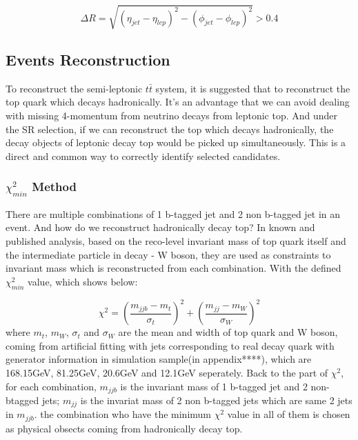 		\begin{equation}
		\Delta R = \sqrt{ (\eta_{jet} - \eta_{lep})^2 - (\phi_{jet} - \phi_{lep})^2 } > 0.4
		\end{equation}



	\subsection{Events Reconstruction}
	\label{ssec:EvtReco}

		To reconstruct the semi-leptonic $t\bar{t}$ system, it is suggested that to reconstruct the top quark which decays hadronically. It's an advantage that we can avoid dealing with missing 4-momentum from neutrino decays from leptonic top. And under the SR selection, if we can reconstruct the top which decays hadronically, the decay objects of leptonic decay top would be picked up simultaneously. This is a direct and common way to correctly identify selected candidates.

		\subsubsection{$\chi^2_{min}$ Method}
		\label{sssec:minchi2_intro} 

			There are multiple combinations of 1 b-tagged jet and 2 non b-tagged jet in an event. And how do we reconstruct hadronically decay top? In known and published analysis, based on the reco-level invariant mass of top quark itself and the intermediate particle in decay - W boson, they are used as constraints to invariant mass which is reconstructed from each combination. With the defined $\chi^2_{min}$ value, which shows below:

			\begin{equation}
			\chi^2 = (\frac{m_{jjb}-m_{t}}{\sigma_{t}})^2 + (\frac{m_{jj}-m_{W}}{\sigma_{W}})^2
			\label{eq:chi2}
			\end{equation}
			where $m_{t}$, $m_{W}$, $\sigma_{t}$ and $\sigma_{W}$ are the mean and width of top quark and W boson, coming from artificial fitting with jets corresponding to real decay quark with generator information in simulation sample(in appendix****), which are 168.15GeV, 81.25GeV, 20.6GeV and 12.1GeV seperately. Back to the part of $\chi^2$, for each combination, $m_{jjb}$ is the invariant mass of 1 b-tagged jet and 2 non-btagged jets; $m_{jj}$ is the invariat mass of 2 non b-tagged jets which are same 2 jets in $m_{jjb}$. the combination who have the minimum ${\chi}^{2}$ value in all of them is chosen as physical obsects coming from hadronically decay top.


